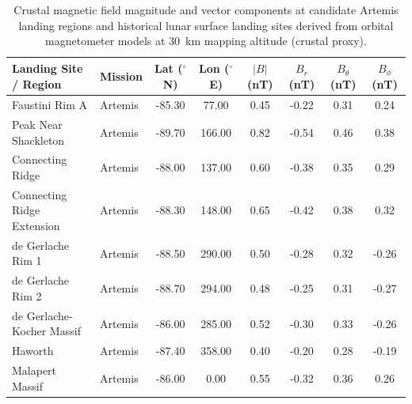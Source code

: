 \begin{table}[t]
\caption{Crustal magnetic field magnitude and vector components at candidate Artemis landing regions and historical lunar surface landing sites derived from orbital magnetometer models at 30~km mapping altitude (crustal proxy).}\label{tab:sites}
\begin{tabular*}{\textwidth}{@{\extracolsep\fill}llcccccc@{}}
\toprule
Landing Site / Region & Mission & Lat ($^\circ$N) & Lon ($^\circ$E) & $|B|$ (nT) & $B_r$ (nT) & $B_\theta$ (nT) & $B_\phi$ (nT) \\
\midrule
\raggedright\footnotesize Faustini Rim A & \footnotesize Artemis & \footnotesize -85.30 & \footnotesize 77.00 & \footnotesize 0.45 & \footnotesize -0.22 & \footnotesize 0.31 & \footnotesize 0.24 \\
\raggedright\footnotesize Peak Near Shackleton & \footnotesize Artemis & \footnotesize -89.70 & \footnotesize 166.00 & \footnotesize 0.82 & \footnotesize -0.54 & \footnotesize 0.46 & \footnotesize 0.38 \\
\raggedright\footnotesize Connecting Ridge & \footnotesize Artemis & \footnotesize -88.00 & \footnotesize 137.00 & \footnotesize 0.60 & \footnotesize -0.38 & \footnotesize 0.35 & \footnotesize 0.29 \\
\raggedright\footnotesize Connecting Ridge Extension & \footnotesize Artemis & \footnotesize -88.30 & \footnotesize 148.00 & \footnotesize 0.65 & \footnotesize -0.42 & \footnotesize 0.38 & \footnotesize 0.32 \\
\raggedright\footnotesize de Gerlache Rim 1 & \footnotesize Artemis & \footnotesize -88.50 & \footnotesize 290.00 & \footnotesize 0.50 & \footnotesize -0.28 & \footnotesize 0.32 & \footnotesize -0.26 \\
\raggedright\footnotesize de Gerlache Rim 2 & \footnotesize Artemis & \footnotesize -88.70 & \footnotesize 294.00 & \footnotesize 0.48 & \footnotesize -0.25 & \footnotesize 0.31 & \footnotesize -0.27 \\
\raggedright\footnotesize de Gerlache-Kocher Massif & \footnotesize Artemis & \footnotesize -86.00 & \footnotesize 285.00 & \footnotesize 0.52 & \footnotesize -0.30 & \footnotesize 0.33 & \footnotesize -0.26 \\
\raggedright\footnotesize Haworth & \footnotesize Artemis & \footnotesize -87.40 & \footnotesize 358.00 & \footnotesize 0.40 & \footnotesize -0.20 & \footnotesize 0.28 & \footnotesize -0.19 \\
\raggedright\footnotesize Malapert Massif & \footnotesize Artemis & \footnotesize -86.00 & \footnotesize 0.00 & \footnotesize 0.55 & \footnotesize -0.32 & \footnotesize 0.36 & \footnotesize 0.26 \\

\end{tabular*}
\end{table}
